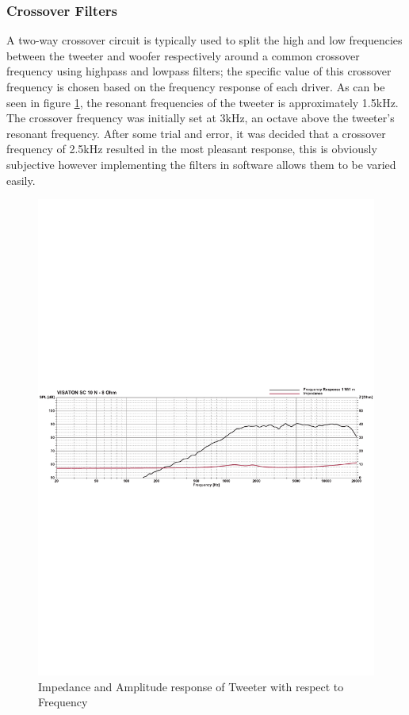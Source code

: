 \documentclass[main.tex]{subfiles}
\begin{document}
\subsubsection{Crossover Filters}
A two-way crossover circuit is typically used to split the high and low frequencies between the tweeter and woofer respectively around a common crossover frequency using highpass and lowpass filters;
the specific value of this crossover frequency is chosen based on the frequency response of each driver.
As can be seen in figure \ref{fig:tweeter-response}, the resonant frequencies of the tweeter is approximately 1.5kHz.
The crossover frequency was initially set at 3kHz, an octave above the tweeter's resonant frequency.
After some trial and error, it was decided that a crossover frequency of 2.5kHz resulted in the most pleasant response, this is obviously subjective however implementing the filters in software allows them to be varied easily.

\begin{figure}[H]
    \centering
    \includegraphics[scale=0.6]{./figs/tweeter-response.pdf}        
    \caption{Impedance and Amplitude response of Tweeter with respect to Frequency\cite{tweeter}}
    \label{fig:tweeter-response}
\end{figure}
\end{document}
